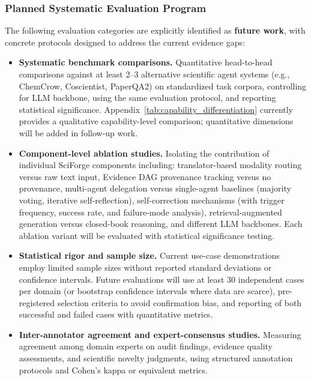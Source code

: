 \documentclass[sn-basic,Numbered,pdflatex]{sn-jnl}
\begin{document}
\subsubsection{Planned Systematic Evaluation Program}

The following evaluation categories are explicitly identified as \textbf{future work}, with concrete protocols designed to address the current evidence gaps:

\begin{itemize}
    \item \textbf{Systematic benchmark comparisons.} Quantitative head-to-head comparisons against at least 2--3 alternative scientific agent systems (e.g., ChemCrow, Coscientist, PaperQA2) on standardized task corpora, controlling for LLM backbone, using the same evaluation protocol, and reporting statistical significance. Appendix~\ref{tab:capability_differentiation} currently provides a qualitative capability-level comparison; quantitative dimensions will be added in follow-up work.
    
    \item \textbf{Component-level ablation studies.} Isolating the contribution of individual SciForge components including: translator-based modality routing versus raw text input, Evidence DAG provenance tracking versus no provenance, multi-agent delegation versus single-agent baselines (majority voting, iterative self-reflection), self-correction mechanisms (with trigger frequency, success rate, and failure-mode analysis), retrieval-augmented generation versus closed-book reasoning, and different LLM backbones. Each ablation variant will be evaluated with statistical significance testing.
    
    \item \textbf{Statistical rigor and sample size.} Current use-case demonstrations employ limited sample sizes without reported standard deviations or confidence intervals. Future evaluations will use at least 30 independent cases per domain (or bootstrap confidence intervals where data are scarce), pre-registered selection criteria to avoid confirmation bias, and reporting of both successful and failed cases with quantitative metrics.
    
    \item \textbf{Inter-annotator agreement and expert-consensus studies.} Measuring agreement among domain experts on audit findings, evidence quality assessments, and scientific novelty judgments, using structured annotation protocols and Cohen's kappa or equivalent metrics.
    

\end{itemize}
\end{document}
